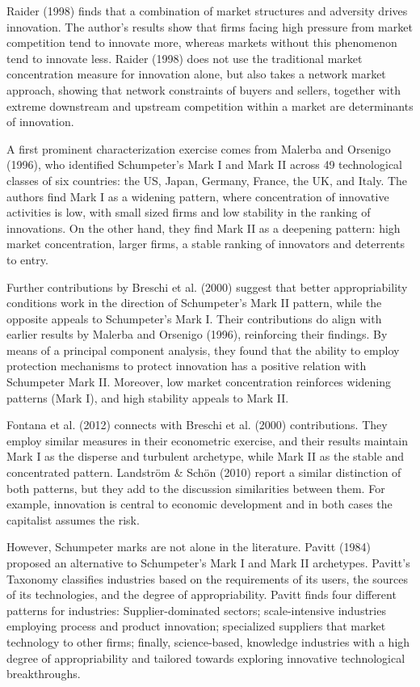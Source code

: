 \documentclass[12pt,a4paper]{article}
\begin{document}
Raider (1998) finds that a combination of market structures and adversity drives innovation. The author’s results show that firms facing high pressure from market competition tend to innovate more, whereas markets without this phenomenon tend to innovate less. Raider (1998) does not use the traditional market concentration measure for innovation alone, but also takes a network market approach, showing that network constraints of buyers and sellers, together with extreme downstream and upstream competition within a market are determinants of innovation. 

A first prominent characterization exercise comes from Malerba and Orsenigo (1996), who identified Schumpeter’s Mark I and Mark II across 49 technological classes of six countries: the US, Japan, Germany, France, the UK, and Italy. The authors find Mark I as a widening pattern, where concentration of innovative activities is low, with small sized firms and low stability in the ranking of innovations. On the other hand, they find Mark II as a deepening pattern: high market concentration, larger firms, a stable ranking of innovators and deterrents to entry.

Further contributions by Breschi et al. (2000) suggest that better appropriability conditions work in the direction of Schumpeter’s Mark II pattern, while the opposite appeals to Schumpeter’s Mark I. Their contributions do align with earlier results by Malerba and Orsenigo (1996), reinforcing their findings. By means of a principal component analysis, they found that the ability to employ protection mechanisms to protect innovation has a positive relation with Schumpeter Mark II. Moreover, low market concentration reinforces widening patterns (Mark I), and high stability appeals to Mark II.   

Fontana et al. (2012) connects with Breschi et al. (2000) contributions. They employ similar measures in their econometric exercise, and their results maintain Mark I as the disperse and turbulent archetype, while Mark II as the stable and concentrated pattern. Landström \& Schön (2010) report a similar distinction of both patterns, but they add to the discussion similarities between them. For example, innovation is central to economic development and in both cases the capitalist assumes the risk.  

However, Schumpeter marks are not alone in the literature. Pavitt (1984) proposed an alternative to Schumpeter’s Mark I and Mark II archetypes. Pavitt's Taxonomy classifies industries based on the requirements of its users, the sources of its technologies, and the degree of appropriability. Pavitt finds four different patterns for industries: Supplier-dominated sectors; scale-intensive industries employing process and product innovation; specialized suppliers that market technology to other firms; finally, science-based, knowledge industries with a high degree of appropriability and tailored towards exploring innovative technological breakthroughs.  
\end{document}
